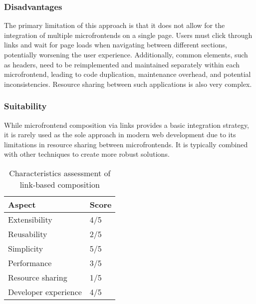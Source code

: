 \subsubsection{Disadvantages}
The primary limitation of this approach is that it does not allow for the integration of multiple microfrontends on a single page. Users must click through links and wait for page loads when navigating between different sections, potentially worsening the user experience.  Additionally, common elements, such as headers, need to be reimplemented and  maintained separately within each microfrontend, leading to code duplication, maintenance overhead, and potential inconsistencies. Resource sharing between such applications is also very complex. \cite{MicrofrontendsInAction}

\subsubsection{Suitability}
While microfrontend composition via links provides a basic integration strategy, it is rarely used as the sole approach in modern web development due to its limitations in resource sharing between microfrontends. It is typically combined with other techniques to create more robust solutions. \cite{MicrofrontendsInAction}

\begin{table}[h]
   \centering
   \begin{tabular}{|l|l|}
      \hline
         \textbf{Aspect} & \textbf{Score} \\
      \hline
         Extensibility & 4/5 \\
      \hline
         Reusability & 2/5 \\
      \hline
         Simplicity & 5/5 \\
      \hline
         Performance & 3/5 \\
      \hline
         Resource sharing & 1/5 \\
      \hline
         Developer experience & 4/5 \\
      \hline
   \end{tabular}
   \caption{Characteristics assessment of link-based composition}
   \label{table:links-composition}
\end{table}